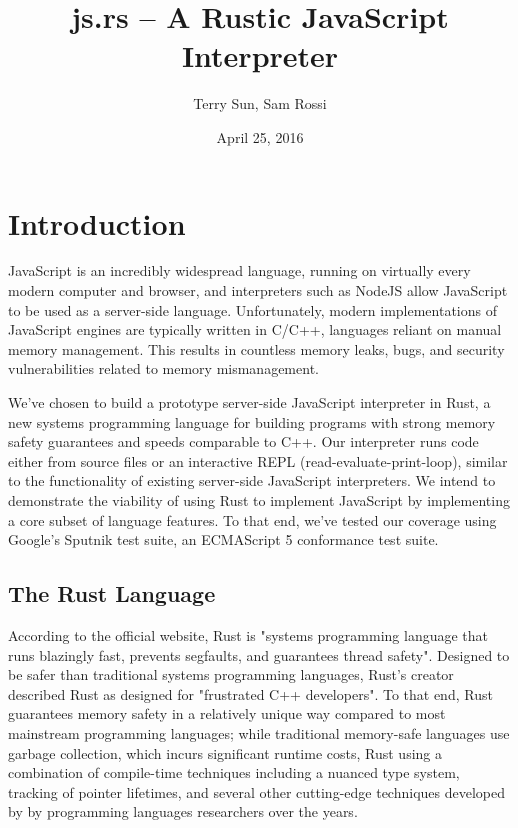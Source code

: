 \documentclass{article}
\title{js.rs -- A Rustic JavaScript Interpreter}
\date{April 25, 2016}
\author{Terry Sun, Sam Rossi}
\begin{document}
\maketitle

\section*{Introduction}

JavaScript is an incredibly widespread language, running on virtually every
modern computer and browser, and interpreters such as NodeJS allow JavaScript to
be used as a server-side language. Unfortunately, modern implementations of
JavaScript engines are typically written in C/C++, languages reliant on manual
memory management. This results in countless memory leaks, bugs, and security
vulnerabilities related to memory mismanagement. \newline

We’ve chosen to build a prototype server-side JavaScript interpreter in Rust, a
new systems programming language for building programs with strong memory safety
guarantees and speeds comparable to C++. Our interpreter runs code either from
source files or an interactive REPL (read-evaluate-print-loop), similar to the
functionality of existing server-side JavaScript interpreters. We intend to
demonstrate the viability of using Rust to implement JavaScript by implementing
a core subset of language features. To that end, we’ve tested our coverage using
Google’s Sputnik test suite, an ECMAScript 5 conformance test suite.

\subsection*{The Rust Language}

According to the official website, Rust is "systems programming language that
runs blazingly fast, prevents segfaults, and guarantees thread
safety"\cite{rust-lang}. Designed to be safer than
traditional systems programming languages, Rust's creator described Rust as
designed for "frustrated C++
developers"\cite{interview}. To that
end, Rust guarantees memory safety in a relatively unique way compared to most
mainstream programming languages; while traditional memory-safe languages use
garbage collection, which incurs significant runtime costs, Rust using a
combination of compile-time techniques including a nuanced type system, tracking
of pointer lifetimes, and several other cutting-edge techniques developed by
by programming languages researchers over the years.
\end{document}
